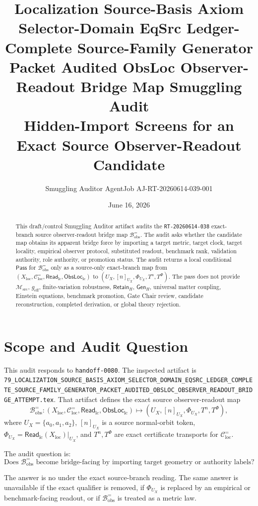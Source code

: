 \documentclass[11pt]{article}
\title{\textbf{Localization Source-Basis Axiom Selector-Domain EqSrc Ledger-Complete Source-Family Generator Packet Audited ObsLoc Observer-Readout Bridge Map Smuggling Audit}\\[0.35em]
\large Hidden-Import Screens for an Exact Source Observer-Readout Candidate}
\author{Smuggling Auditor AgentJob AJ-RT-20260614-039-001}
\date{June 16, 2026}
\newcommand{\ReadLC}{\mathsf{Read}_{\mathrm{lc}}}
\newcommand{\ObsLocLC}{\mathsf{ObsLoc}_{\mathrm{lc}}}
\newcommand{\RetainH}{\mathsf{Retain}_{H}}
\newcommand{\GenH}{\mathsf{Gen}_{H}}
\newcommand{\Bobs}{\mathcal{B}^{=}_{\mathrm{obs}}}
\newcommand{\Msrc}{\mathcal{M}_{\mathrm{src}}}
\newcommand{\geff}{g_{\mathrm{eff}}}
\newcommand{\Pass}{\mathsf{Pass}}
\begin{document}
\maketitle

\begin{abstract}
This draft/control Smuggling Auditor artifact audits the
\texttt{RT-20260614-038} exact-branch source observer-readout bridge
map \(\Bobs\). The audit asks whether the candidate map obtains its
apparent bridge force by importing a target metric, target clock,
target locality, empirical observer protocol, substituted readout,
benchmark rank, validation authority, role authority, or promotion
status. The audit returns a local conditional \(\Pass\) for
\(\Bobs\) only as a source-only exact-branch map from
\((X_{\mathrm{loc}},\mathcal{C}^{=}_{\mathrm{loc}},\ReadLC,\ObsLocLC)\)
to \((U_X,[n]_{U_X},\Phi_{U_X},T^n,T^\Phi)\). The pass does not
provide \(\Msrc\), \(\geff\), finite-variation robustness,
\(\RetainH\), \(\GenH\), universal matter coupling, Einstein
equations, benchmark promotion, Gate Chair review, candidate
reconstruction, completed derivation, or global theory rejection.
\end{abstract}

\section{Scope and Audit Question}

This audit responds to \texttt{handoff-0080}. The inspected artifact is
\texttt{79\_LOCALIZATION\_SOURCE\_BASIS\_AXIOM\_SELECTOR\_DOMAIN\_EQSRC\_LEDGER\_COMPLETE\_SOURCE\_FAMILY\_GENERATOR\_PACKET\_AUDITED\_OBSLOC\_OBSERVER\_READOUT\_BRIDGE\_ATTEMPT.tex}.
That artifact defines the exact source observer-readout map
\[
    \Bobs
    :
    (X_{\mathrm{loc}},\mathcal{C}^{=}_{\mathrm{loc}},\ReadLC,\ObsLocLC)
    \longmapsto
    (U_X,[n]_{U_X},\Phi_{U_X},T^n,T^\Phi),
\]
where \(U_X=\{a_0,a_1,a_2\}\), \([n]_{U_X}\) is a source normal-orbit
token, \(\Phi_{U_X}=\ReadLC(X_{\mathrm{loc}})|_{U_X}\), and
\(T^n,T^\Phi\) are exact certificate transports for
\(\mathcal{C}^{=}_{\mathrm{loc}}\).

The audit question is:
\[
    \text{Does \(\Bobs\) become bridge-facing by importing target
    geometry or authority labels?}
\]

The answer is no under the exact source-branch reading. The same
answer is unavailable if the exact qualifier is removed, if
\(\Phi_{U_X}\) is replaced by an empirical or benchmark-facing
readout, or if \(\Bobs\) is treated as a metric law.
\end{document}
